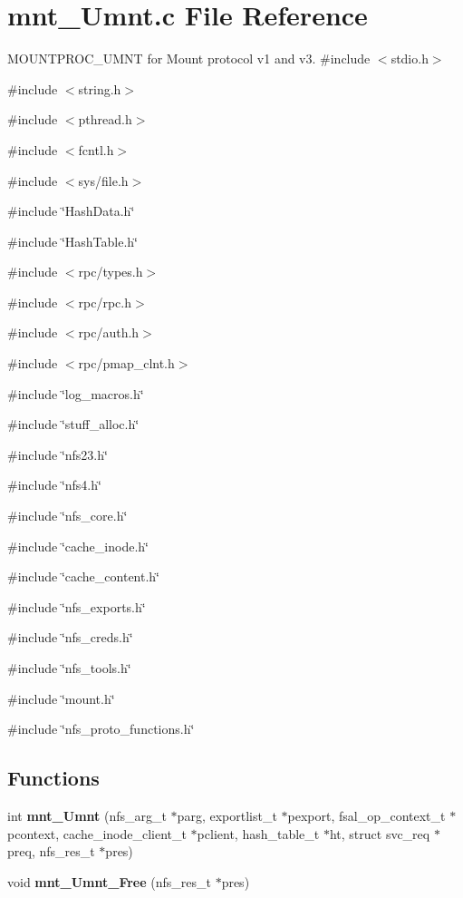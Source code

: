 \section{mnt\_\-Umnt.c File Reference}
\label{mnt__Umnt_8c}


MOUNTPROC\_\-UMNT for Mount protocol v1 and v3.  
{\ttfamily \#include $<$stdio.h$>$}\par
{\ttfamily \#include $<$string.h$>$}\par
{\ttfamily \#include $<$pthread.h$>$}\par
{\ttfamily \#include $<$fcntl.h$>$}\par
{\ttfamily \#include $<$sys/file.h$>$}\par
{\ttfamily \#include \char`\"{}HashData.h\char`\"{}}\par
{\ttfamily \#include \char`\"{}HashTable.h\char`\"{}}\par
{\ttfamily \#include $<$rpc/types.h$>$}\par
{\ttfamily \#include $<$rpc/rpc.h$>$}\par
{\ttfamily \#include $<$rpc/auth.h$>$}\par
{\ttfamily \#include $<$rpc/pmap\_\-clnt.h$>$}\par
{\ttfamily \#include \char`\"{}log\_\-macros.h\char`\"{}}\par
{\ttfamily \#include \char`\"{}stuff\_\-alloc.h\char`\"{}}\par
{\ttfamily \#include \char`\"{}nfs23.h\char`\"{}}\par
{\ttfamily \#include \char`\"{}nfs4.h\char`\"{}}\par
{\ttfamily \#include \char`\"{}nfs\_\-core.h\char`\"{}}\par
{\ttfamily \#include \char`\"{}cache\_\-inode.h\char`\"{}}\par
{\ttfamily \#include \char`\"{}cache\_\-content.h\char`\"{}}\par
{\ttfamily \#include \char`\"{}nfs\_\-exports.h\char`\"{}}\par
{\ttfamily \#include \char`\"{}nfs\_\-creds.h\char`\"{}}\par
{\ttfamily \#include \char`\"{}nfs\_\-tools.h\char`\"{}}\par
{\ttfamily \#include \char`\"{}mount.h\char`\"{}}\par
{\ttfamily \#include \char`\"{}nfs\_\-proto\_\-functions.h\char`\"{}}\par
\subsection*{Functions}
\begin{DoxyCompactItemize}
\item 
int {\bf mnt\_\-Umnt} (nfs\_\-arg\_\-t $\ast$parg, exportlist\_\-t $\ast$pexport, fsal\_\-op\_\-context\_\-t $\ast$pcontext, cache\_\-inode\_\-client\_\-t $\ast$pclient, hash\_\-table\_\-t $\ast$ht, struct svc\_\-req $\ast$preq, nfs\_\-res\_\-t $\ast$pres)
\item 
void {\bf mnt\_\-Umnt\_\-Free} (nfs\_\-res\_\-t $\ast$pres)
\end{DoxyCompactItemize}


